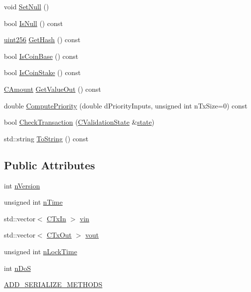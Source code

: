 \begin{DoxyCompactItemize}
\item 
void \hyperlink{class_c_transaction_a1aa7a38971e9c045b12a3efab67647e9}{Set\+Null} ()
\item 
bool \hyperlink{class_c_transaction_af2f0fe5a8853ea2928f77b97581031a6}{Is\+Null} () const 
\item 
\hyperlink{classuint256}{uint256} \hyperlink{class_c_transaction_a3f8666d2a275c40da14bd5eaf47dc004}{Get\+Hash} () const 
\item 
bool \hyperlink{class_c_transaction_a274384ecbb50d71355cd287b7a6bca51}{Is\+Coin\+Base} () const 
\item 
bool \hyperlink{class_c_transaction_a8d924e18ddcf4c31bc7483b3a157113d}{Is\+Coin\+Stake} () const 
\item 
\hyperlink{amount_8h_a4eaf3a5239714d8c45b851527f7cb564}{C\+Amount} \hyperlink{class_c_transaction_aef472df5cb11c53281d975ee9e7cf133}{Get\+Value\+Out} () const 
\item 
double \hyperlink{class_c_transaction_ad2452fe2ae424f43e5fd767c28517b3b}{Compute\+Priority} (double d\+Priority\+Inputs, unsigned int n\+Tx\+Size=0) const 
\item 
bool \hyperlink{class_c_transaction_afa2875bea30d31900a30baf7fd56b96b}{Check\+Transaction} (\hyperlink{class_c_validation_state}{C\+Validation\+State} \&\hyperlink{version__set_8cc_a6aad002d0db5e5e85dc31927a5a6f503}{state})
\item 
std\+::string \hyperlink{class_c_transaction_ae5fde44ffb46045dd48bd9cfff9492b6}{To\+String} () const 
\end{DoxyCompactItemize}
\subsection*{Public Attributes}
\begin{DoxyCompactItemize}
\item 
int \hyperlink{class_c_transaction_a6c29bdd822859c7b21b7b6c22dca6825}{n\+Version}
\item 
unsigned int \hyperlink{class_c_transaction_a8ccb4b6020669bc562095e3417715e41}{n\+Time}
\item 
std\+::vector$<$ \hyperlink{class_c_tx_in}{C\+Tx\+In} $>$ \hyperlink{class_c_transaction_a53fa787e4ea57374b4fa2a28e9a957b2}{vin}
\item 
std\+::vector$<$ \hyperlink{class_c_tx_out}{C\+Tx\+Out} $>$ \hyperlink{class_c_transaction_ae42c0032a464c3054c508017c7d040ef}{vout}
\item 
unsigned int \hyperlink{class_c_transaction_ab01e4e451d2f3f84b01380979c8fdacc}{n\+Lock\+Time}
\item 
int \hyperlink{class_c_transaction_a2a1fd6929add85d3df299249da78d015}{n\+Do\+S}
\item 
\hyperlink{class_c_transaction_a329b40b323445b322ab460c966669944}{A\+D\+D\+\_\+\+S\+E\+R\+I\+A\+L\+I\+Z\+E\+\_\+\+M\+E\+T\+H\+O\+D\+S}
\end{DoxyCompactItemize}
